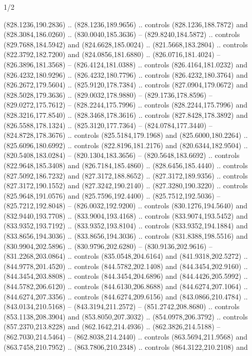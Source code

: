 \begin{flagdescription}{1/2}
\begin{scope}[xshift=0.75\flaglength,yshift=0.5\flagwidth,scale=0.00293\flagwidth]
\begin{scope}[scale=0.675,y=0.80pt, x=0.80pt,yscale=-1,xshift=-720,yshift=-240]
\begin{scope}[miter limit=4.80]
\begin{scope}[miter limit=3.00]
\begin{scope}[fill=black]
  (828.1236,190.2836) .. (828.1236,189.9656) .. controls (828.1236,188.7872) and
  (828.3084,186.0260) .. (830.0040,185.3636) -- (829.8240,184.5872) .. controls
  (829.7688,184.5942) and (824.6628,185.0024) .. (821.5668,183.2804) .. controls
  (822.3792,182.7200) and (824.0856,181.6880) .. (826.0716,181.4024) --
  (826.3896,181.3568) -- (826.4124,181.0388) .. controls (826.4164,181.0232) and
  (826.4232,180.9296) .. (826.4232,180.7796) .. controls (826.4232,180.3764) and
  (826.2672,179.5604) .. (825.9120,178.7384) .. controls (827.0904,179.0672) and
  (828.5028,179.3636) .. (829.0032,178.9880) -- (829.1736,178.8596) --
  (829.0272,175.7612) -- (828.2244,175.7996) .. controls (828.2244,175.7996) and
  (828.3216,177.8540) .. (828.3468,178.3616) .. controls (827.8428,178.3892) and
  (826.5588,178.1324) .. (825.3120,177.7364) -- (824.0784,177.3440) --
  (824.8728,178.3676) .. controls (825.5184,179.1968) and (825.6000,180.2264) ..
  (825.6096,180.6992) .. controls (822.8196,181.2176) and (820.6344,182.9504) ..
  (820.5408,183.0284) -- (820.1304,183.3656) -- (820.5648,183.6692) .. controls
  (822.9648,185.3408) and (826.7184,185.4860) .. (828.6456,185.4440) .. controls
  (827.5092,186.7232) and (827.3172,188.8652) .. (827.3172,189.9356) .. controls
  (827.3172,190.1552) and (827.3242,190.2140) .. (827.3280,190.3220) .. controls
  (825.9648,191.0576) and (825.7596,192.4400) .. (825.7512,192.5036) --
  (825.7212,192.8048) -- (826.0032,192.9200) .. controls (830.1276,194.5640) and
  (832.9440,193.7708) .. (833.9004,193.4168) .. controls (833.9074,193.5452) and
  (833.9352,193.7192) .. (833.9352,193.8104) .. controls (833.9352,194.1884) and
  (833.8656,194.3036) .. (833.8656,194.3036) .. controls (831.8388,198.5516) and
  (830.9904,202.5896) .. (830.9796,202.6280) -- (830.9136,202.9616) --
  (831.2268,203.0864) .. controls (835.0548,204.6164) and (841.9318,202.5272) ..
  (844.9778,201.4520) .. controls (844.5782,202.1408) and (844.3454,202.9160) ..
  (844.3454,203.8808) .. controls (844.3454,204.6896) and (844.4426,205.5992) ..
  (844.5782,206.6120) .. controls (844.6130,206.8688) and (844.6274,207.1064) ..
  (844.6274,207.3356) .. controls (844.6274,209.6156) and (843.0866,210.4784) ..
  (843.0134,210.5168) -- (843.3194,211.2572) -- (851.2742,208.8680) .. controls
  (853.1138,208.3904) and (853.8050,207.3032) .. (854.0978,206.3792) .. controls
  (857.2370,213.8228) and (862.1642,214.4936) .. (862.3826,214.5188) --
  (862.7030,214.5464) -- (862.8038,214.2440) .. controls (863.5694,211.9568) and
  (863.7458,210.7952) .. (863.7806,210.2348) .. controls (864.3122,210.2108) and

\end{scope}
\end{scope}
\end{scope}
\end{scope}
\end{scope}
\end{flagdescription}
